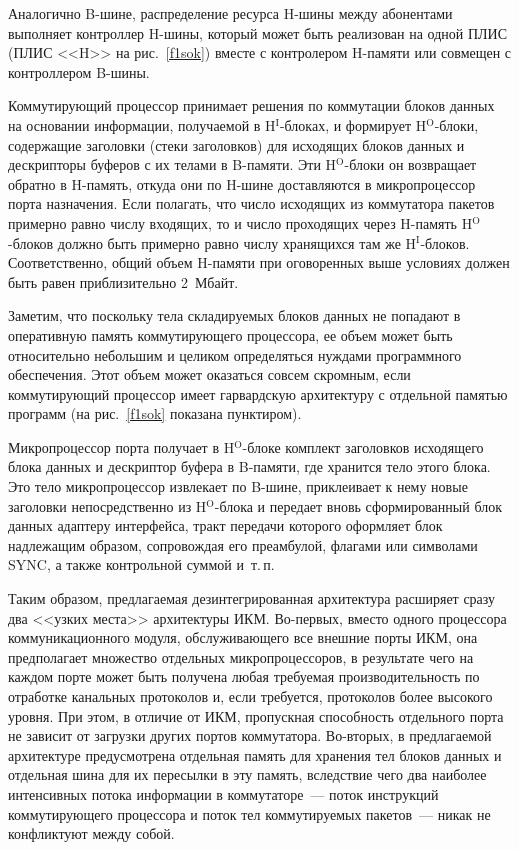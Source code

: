 \begin{multicols}{2}
    Аналогично B-шине, распределение ресурса H-ши\-ны между абонентами выполняет
контроллер H-ши\-ны, который может быть реализован на одной ПЛИС (ПЛИС <<H>> на
рис.~\ref{f1sok}) вместе с контролером H-памяти или совмещен с контроллером B-шины.

    Коммутирующий процессор принимает решения по коммутации блоков данных на
основании информации, получаемой в H$^{\mathrm{I}}$-блоках, и формирует H$^{\mathrm{O}}$-блоки, содержащие
заголовки (стеки заголовков) для исходящих блоков данных и дескрипторы буферов с их
телами в B-памяти. Эти H$^{\mathrm{O}}$-блоки он возвращает обратно в H-память, откуда они по H-шине
доставляются в микропроцессор порта назначения. Если полагать, что число исходящих из
коммутатора пакетов примерно равно числу входящих, то и число проходящих через H-память
H$^{\mathrm{O}}$-блоков должно быть примерно равно числу хранящихся там же H$^{\mathrm{I}}$-блоков.
Соответственно, общий объем H-памяти при оговоренных выше условиях должен быть равен
приблизительно 2~Мбайт.

    Заметим, что поскольку тела складируемых блоков данных не попадают в оперативную
память коммутирующего процессора, ее объем может быть относительно небольшим и целиком
определяться нуждами программного обеспечения. Этот объем может оказаться совсем
скромным, если коммутирующий процессор имеет гарвардскую архитектуру с отдельной
памятью программ (на рис.~\ref{f1sok} показана пунктиром).

    Микропроцессор порта получает в H$^{\mathrm{O}}$-блоке комплект заголовков исходящего блока
данных и дескриптор буфера в B-памяти, где хранится тело этого блока. Это тело
микропроцессор извлекает по B-шине, приклеивает к нему новые заголовки непосредственно из
H$^{\mathrm{O}}$-блока и передает вновь сформированный блок данных адаптеру интерфейса, тракт
передачи которого оформляет блок надлежащим образом, сопровождая его преамбулой,
флагами или символами SYNC, а также контрольной суммой и~т.\,п.

    Таким образом, предлагаемая дезинтегрированная архитектура расширяет сразу два <<узких
места>> архитектуры ИКМ. Во-первых, вместо одного процессора коммуникационного модуля,
обслу\-жи\-ва\-юще\-го все внешние порты ИКМ, она предполагает множество отдельных
микропроцессоров, в результате чего на каждом порте может быть получена любая требуемая
производительность по отработке канальных протоколов и, если требуется, протоколов более
высокого уровня. При этом, в отличие от ИКМ, пропускная способность отдельного порта не
зависит от загрузки других портов коммутатора. Во-вторых, в предлагаемой архитектуре
предусмот\-ре\-на отдельная память для хранения тел блоков данных и отдельная шина для их
пересылки в эту память, вследствие чего два наиболее интенсивных потока информации в
коммутаторе~--- поток инструкций коммутирующего процессора и поток тел коммутируемых
пакетов~--- никак не конфликтуют между собой.


\end{multicols}
